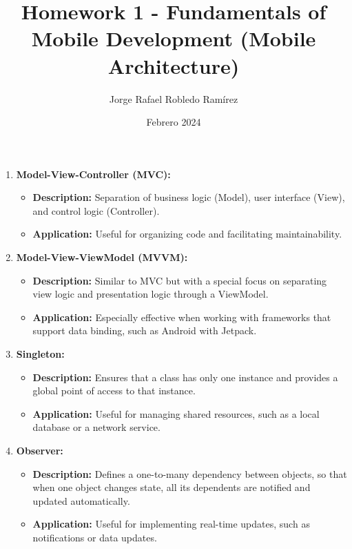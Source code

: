 \documentclass{article}
\title{Homework 1 - Fundamentals of Mobile Development (Mobile Architecture)}
\author{Jorge Rafael Robledo Ramírez}
\date{Febrero 2024}
\begin{document}
\maketitle %

\begin{enumerate}

    \item \textbf{Model-View-Controller (MVC):}
        \begin{itemize}
            \item \textbf{Description:} Separation of business logic (Model), user interface (View), and control logic (Controller).
            \item \textbf{Application:} Useful for organizing code and facilitating maintainability.
        \end{itemize}

    \item \textbf{Model-View-ViewModel (MVVM):}
        \begin{itemize}
            \item \textbf{Description:} Similar to MVC but with a special focus on separating view logic and presentation logic through a ViewModel.
            \item \textbf{Application:} Especially effective when working with frameworks that support data binding, such as Android with Jetpack.
        \end{itemize}

    \item \textbf{Singleton:}
        \begin{itemize}
            \item \textbf{Description:} Ensures that a class has only one instance and provides a global point of access to that instance.
            \item \textbf{Application:} Useful for managing shared resources, such as a local database or a network service.
        \end{itemize}

    \item \textbf{Observer:}
        \begin{itemize}
            \item \textbf{Description:} Defines a one-to-many dependency between objects, so that when one object changes state, all its dependents are notified and updated automatically.
            \item \textbf{Application:} Useful for implementing real-time updates, such as notifications or data updates.
        \end{itemize}


\end{enumerate}
\end{document}
